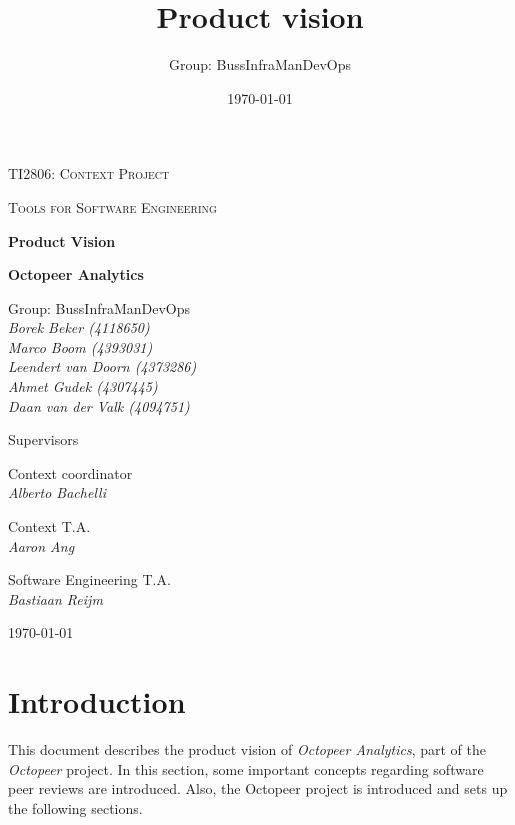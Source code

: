 \documentclass{article}
\title{Product vision}
\author{Group: BussInfraManDevOps}
\date{\today}
\begin{document}
\begin{titlepage}
	\centering
	{\scshape\LARGE TI2806: Context Project \par}
	\vspace{0.2cm}
	{\scshape\Large Tools for Software Engineering\par}
	\vspace{1.5cm}
	{\Huge\bfseries Product Vision\par}
	\vspace{0.5cm}
	{\LARGE\bfseries Octopeer Analytics\par}
	\vspace{3cm}
	{\LARGE
	  Group: BussInfraManDevOps \\
	  \vspace{0.4cm}
	  \Large
	  \itshape
        Borek Beker \textnormal{(4118650)}\\
        Marco Boom \textnormal{(4393031)}\\
        Leendert van Doorn \textnormal{(4373286)}\\
        Ahmet Gudek \textnormal{(4307445)}\\
        Daan van der Valk \textnormal{(4094751)}\\
    \par}
	\vspace{1cm}
	{\LARGE
	  Supervisors \\
	  \Large
        
        \begin{multicols}{3}
        Context coordinator\\
        \textit{Alberto Bachelli}
        \columnbreak
        
        Context T.A.\\
        \textit{Aaron Ang}\\
        \columnbreak
        
        Software Engineering T.A.\\
        \textit{Bastiaan Reijm}\\
        \end{multicols}
    \par}

	\vfill

	{\large \today\par}
\end{titlepage}

\tableofcontents
\newpage


\setlength{\parindent}{0em}
\setlength{\parskip}{1em}
\section{Introduction} \label{section:introduction}
This document describes the product vision of \textit{Octopeer Analytics}, part of the \textit{Octopeer} project. In this section, some important concepts regarding software peer reviews are introduced. Also, the Octopeer project is introduced and sets up the following sections.
\end{document}
